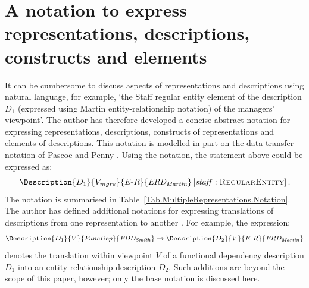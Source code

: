 \documentclass[11pt,oribibl]{llncs}
\newcommand{\ER}{\mathit{E\textrm{-}R}}
\newcommand{\Martin}{\mathit{ERD_{Martin}}}
\newcommand{\FD}{\mathit{FuncDep}}
\newcommand{\Smith}{\mathit{FDD_{Smith}}}
\begin{document}
\newcommand{\domain}[1]{\textsc{#1}}

\newcommand{\Element}[2]{\ensuremath{ #1 \left[ #2 \right] }}
\newcommand{\Elementt}[3]{\ensuremath{ #1 \left[ #2 : \domain{#3} \right] }}

\newcommand{\construct}[2]{\ensuremath{ #1 \left[ \domain{#2} \right] }}
\newcommand{\Construct}[2]{\ensuremath{ \mathfrak{#1} \left[ \domain{#2} \right] }}


\section{A notation to express representations, descriptions, constructs and elements}
\label{Sec:Notation}

It can be cumbersome to discuss aspects of representations and descriptions using natural language, for example, `the \textsf{Staff} regular entity element of the description $D_{1}$ (expressed using Martin entity-relationship notation) of the managers' viewpoint'. The author has therefore developed a concise abstract notation for expressing representations, descriptions, constructs of representations and elements of descriptions. This notation is modelled in part on the data transfer notation of Pascoe and Penny \cite{Pasc:RT:1995}. Using the notation, the statement above could be expressed as:
\[	\Elementt{\Description{D_{1}}{V_{mgrs}}{\ER}{\Martin}}{\mathit{staff}}{RegularEntity}\text{.}	\]
The notation is summarised in Table~\ref{Tab.MultipleRepresentations.Notation}. The author has defined additional notations for expressing translations of descriptions from one representation to another \cite{Stan:N:1999:PhD}. For example, the expression:
\[	\Description{D_{1}}{V}{\FD}{\Smith} \rightarrow \Description{D_{2}}{V}{\ER}{\Martin}
\]
denotes the translation within viewpoint $V$ of a functional dependency description $D_{1}$ into an entity-relationship description $D_{2}$. Such additions are beyond the scope of this paper, however; only the base notation is discussed here.

\end{document}
